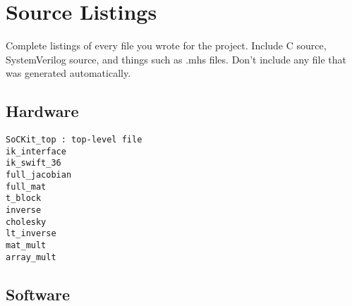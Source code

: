 \section{Source Listings}
Complete listings of every file you wrote for the project. Include C source, SystemVerilog source, and things such as .mhs files. Don't include any file that was generated automatically.

\subsection{Hardware}
\begin{verbatim}
SoCKit_top : top-level file
ik_interface
ik_swift_36
full_jacobian
full_mat
t_block
inverse
cholesky
lt_inverse
mat_mult
array_mult
\end{verbatim}

\subsection{Software}


